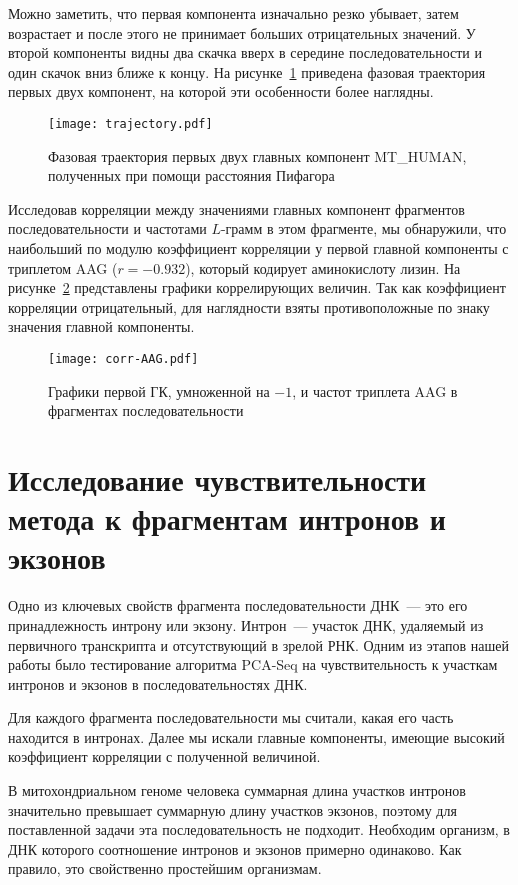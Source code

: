 Можно заметить, что первая компонента изначально резко убывает, затем возрастает и после этого не принимает больших отрицательных значений. У второй компоненты видны два скачка вверх в середине последовательности и один скачок вниз ближе к концу. На рисунке~\ref{trajectory} приведена фазовая траектория первых двух компонент, на которой эти особенности более наглядны.

\begin{figure}[!t]
  \centering
  \texttt{[image: trajectory.pdf]}
  \caption{Фазовая траектория первых двух главных компонент MT\_HUMAN, полученных при помощи расстояния Пифагора}
  \label{trajectory}
\end{figure}

Исследовав корреляции между значениями главных компонент фрагментов последовательности и частотами $L$-грамм в этом фрагменте, мы обнаружили, что наибольший по модулю коэффициент корреляции у первой главной компоненты с триплетом AAG ($r = -0.932$), который кодирует аминокислоту лизин. На рисунке~\ref{corr-AAG} представлены графики коррелирующих величин. Так как коэффициент корреляции отрицательный, для наглядности взяты противоположные по знаку значения главной компоненты.

\begin{figure}[!t]
  \centering
  \texttt{[image: corr-AAG.pdf]}
  \caption{Графики первой ГК, умноженной на $-1$, и частот триплета AAG в фрагментах последовательности}
  \label{corr-AAG}
\end{figure}

\section{Исследование чувствительности метода к фрагментам интронов и экзонов}

Одно из ключевых свойств фрагмента последовательности ДНК~--- это его принадлежность интрону или экзону. Интрон~--- участок ДНК, удаляемый из первичного транскрипта и отсутствующий в зрелой РНК. Одним из этапов нашей работы было тестирование алгоритма PCA-Seq на чувствительность к участкам интронов и экзонов в последовательностях ДНК.

Для каждого фрагмента последовательности мы считали, какая его часть находится в интронах. Далее мы искали главные компоненты, имеющие высокий коэффициент корреляции с полученной величиной.

В митохондриальном геноме человека суммарная длина участков интронов значительно превышает суммарную длину участков экзонов, поэтому для поставленной задачи эта последовательность не подходит. Необходим организм, в ДНК которого соотношение интронов и экзонов примерно одинаково. Как правило, это свойственно простейшим организмам.

